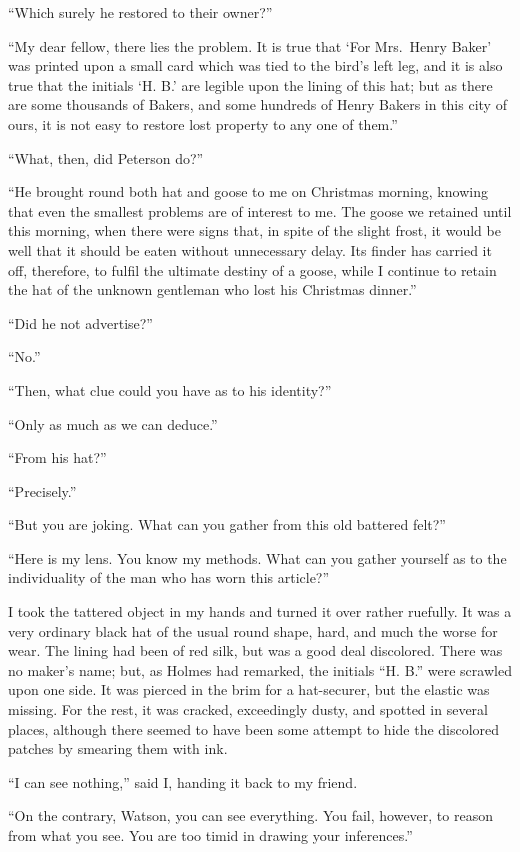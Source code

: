 “Which surely he restored to their owner?”

“My dear fellow, there lies the problem. It is true that
‘For Mrs.~Henry Baker’ was printed upon a small card which
was tied to the bird’s left leg, and it is also true that the
initials ‘H. B.’ are legible upon the lining of this hat; but as
there are some thousands of Bakers, and some hundreds of
Henry Bakers in this city of ours, it is not easy to restore lost
property to any one of them.”

“What, then, did Peterson do?”

“He brought round both hat and goose to me on Christmas
morning, knowing that even the smallest problems are of
interest to me. The goose we retained until this morning,
when there were signs that, in spite of the slight frost, it
would be well that it should be eaten without unnecessary
delay. Its finder has carried it off, therefore, to fulfil the
ultimate destiny of a goose, while I continue to retain
the hat of the unknown gentleman who lost his Christmas
dinner.”

“Did he not advertise?”

“No.”

“Then, what clue could you have as to his identity?”

“Only as much as we can deduce.”

“From his hat?”

“Precisely.”

“But you are joking. What can you gather from this old
battered felt?”

“Here is my lens. You know my methods. What can you
gather yourself as to the individuality of the man who has worn
this article?”

I took the tattered object in my hands and turned it over
rather ruefully. It was a very ordinary black hat of the usual
round shape, hard, and much the worse for wear. The lining
had been of red silk, but was a good deal discolored. There
was no maker’s name; but, as Holmes had remarked, the
initials “H. B.” were scrawled upon one side. It was pierced
in the brim for a hat-securer, but the elastic was missing.
For the rest, it was cracked, exceedingly dusty, and spotted
in several places, although there seemed to have been some
attempt to hide the discolored patches by smearing them with
ink.

“I can see nothing,” said I, handing it back to my friend.

“On the contrary, Watson, you can see everything. You
fail, however, to reason from what you see. You are too timid
in drawing your inferences.”

